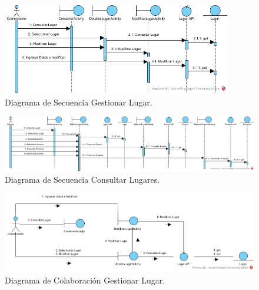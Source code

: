 \documentclass[12pt,letterpaper,openany]{book}
\begin{document}
\begin{figure}[H]
\begin{center}
\includegraphics[width=10cm]{./imagenes/DS/DS_gestionar_lugar}
\caption{Diagrama de Secuencia Gestionar Lugar.}
\end{center}
\end{figure}

\begin{figure}[H]
\begin{center}
\includegraphics[width=14cm]{./imagenes/DS/DS_consultar_lugares}
\caption{Diagrama de Secuencia Consultar Lugares.}
\end{center}
\end{figure}



\begin{figure}[H]
\begin{center}
\includegraphics[width=14cm]{./imagenes/DC/DC_gestionar_lugar}
\caption{Diagrama de Colaboración Gestionar Lugar.}
\end{center}
\end{figure}
\end{document}

